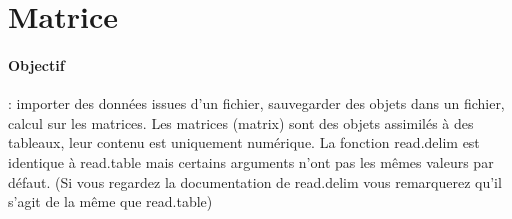 \section{Matrice}
\paragraph{Objectif} : importer des données issues d'un fichier, sauvegarder des objets dans un fichier, calcul sur les matrices.
Les matrices (matrix) sont des objets assimilés à des tableaux, leur contenu est uniquement numérique.
La fonction read.delim est identique à read.table mais certains arguments n'ont pas les mêmes valeurs par défaut. (Si vous regardez la documentation de read.delim vous remarquerez qu'il s'agit de la même que read.table)


